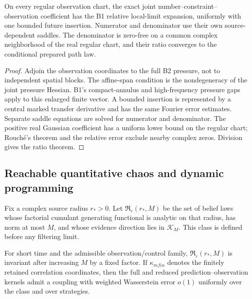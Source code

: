\begin{theorem}
\label{thm:r12-c1-coefficient}
On every regular observation chart, the exact joint number--constraint--
observation coefficient has the B1 relative local-limit expansion, uniformly
with one bounded future insertion.  Numerator and denominator use their own
source-dependent saddles.  The denominator is zero-free on a common complex
neighborhood of the real regular chart, and their ratio converges to the
conditional prepared path law.
\end{theorem}

\begin{proof}
Adjoin the observation coordinates to the full B2 pressure, not to independent
spatial blocks.  The affine-span condition is the nondegeneracy of the joint
pressure Hessian.  B1's compact-annulus and high-frequency pressure gaps apply
to this enlarged finite vector.  A bounded insertion is represented by a
central marked transfer derivative and has the same Fourier error estimates.
Separate saddle equations are solved for numerator and denominator.  The
positive real Gaussian coefficient has a uniform lower bound on the regular
chart; Rouch\'e's theorem and the relative error exclude nearby complex zeros.
Division gives the ratio theorem.
\end{proof}

\subsection{Reachable quantitative chaos and dynamic programming}

Fix a complex source radius $r_*>0$.  Let $\mathfrak R_\varepsilon(r_*,M)$ be
the set of belief laws whose factorial cumulant generating functional is
analytic on that radius, has norm at most $M$, and whose evidence direction
lies in $\mathcal K_M$.  This class is defined before any filtering limit.

\begin{lemma}
\label{lem:r12-c1-chaos}
For short time and the admissible observation/control family,
$\mathfrak R_\varepsilon(r_*,M)$ is invariant after increasing $M$ by a fixed
factor.  If $\kappa_{
m fin}$ denotes the finitely retained correlation
coordinates, then the full and reduced prediction--observation kernels admit a
coupling with weighted Wasserstein error $o(1)$ uniformly over the class and
over strategies.
\end{lemma}

